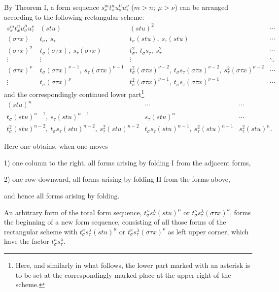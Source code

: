 \documentclass[11pt]{article}
\begin{document}
By Theorem I, a form sequence $s_x^m t_x^n u_\sigma^\mu u_\tau^\nu$ ($m>n;\ \mu>\nu$) can be arranged according to the following rectangular scheme:
\begingroup\small
\[
\begin{array}{c|c|c|c}
s_x^m t_x^n u_\sigma^\mu u_\tau^\nu
& (stu)
& (stu)^2
& \cdots\\[0.3em]
(\sigma\tau x)
& t_\sigma,\ s_\tau
& t_\sigma(stu),\ s_\tau(stu)
& \cdots\\[0.3em]
(\sigma\tau x)^2
& t_\sigma(\sigma\tau x),\ s_\tau(\sigma\tau x)
& t_\sigma^2,\ t_\sigma s_\tau,\ s_\tau^2
& \cdots\\[0.3em]
\vdots&\vdots&\vdots&\ddots\\[0.3em]
(\sigma\tau x)^\nu
& t_\sigma(\sigma\tau x)^{\nu-1},\ s_\tau(\sigma\tau x)^{\nu-1}
& t_\sigma^2(\sigma\tau x)^{\nu-2},\ t_\sigma s_\tau(\sigma\tau x)^{\nu-2},\ s_\tau^2(\sigma\tau x)^{\nu-2}
& \cdots\\[0.3em]
\vdots
& t_\sigma(\sigma\tau x)^\nu
& t_\sigma^2(\sigma\tau x)^{\nu-1},\ t_\sigma s_\tau(\sigma\tau x)^{\nu-1}
& \cdots
\end{array}
\]
\endgroup
and the correspondingly continued lower part\footnote{Here, and similarly in what follows, the lower part marked with an asterisk is to be set at the correspondingly marked place at the upper right of the scheme.}
\begingroup\small
\[
\begin{array}{c|c|c}
(stu)^n & \cdots & \cdots\\[0.3em]
t_\sigma(stu)^{n-1},\ s_\tau(stu)^{n-1}
& s_\tau(stu)^n & \cdots\\[0.3em]
t_\sigma^2(stu)^{n-2},\ t_\sigma s_\tau(stu)^{n-2},\ s_\tau^2(stu)^{n-2}
& t_\sigma s_\tau(stu)^{n-1},\ s_\tau^2(stu)^{n-1}
& s_\tau^2(stu)^n .
\end{array}
\]
\endgroup

Here one obtains, when one moves

1) one column to the right, all forms arising by folding I from the adjacent forms,

2) one row downward, all forms arising by folding II from the forms above,

and hence all forms arising by folding.

An arbitrary form of the total form sequence, $t_\sigma^\kappa s_\tau^\lambda(stu)^\mu$ or $t_\sigma^\kappa s_\tau^\lambda(\sigma\tau x)^\nu$, forms the beginning of a new form sequence, consisting of all those forms of the rectangular scheme with $t_\sigma^\kappa s_\tau^\lambda(stu)^\mu$ or $t_\sigma^\kappa s_\tau^\lambda(\sigma\tau x)^\nu$ as left upper corner, which have the factor $t_\sigma^\kappa s_\tau^\lambda$.
\end{document}
